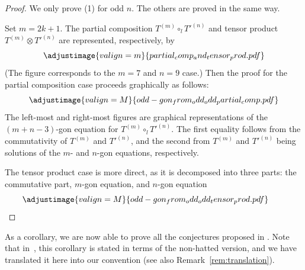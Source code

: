 \documentclass[10pt,a4paper]{amsart}
\numberwithin{equation}{section}
\theoremstyle{definition}
\begin{document}
\begin{proof}
We only prove (1) for odd $n$. The others are proved in the same way.

Set $m=2k+1$. The partial composition $T^{(m)}\circ_lT'^{(n)}$ and tensor product $T^{(m)}\otimes T'^{(n)}$ are represented, respectively, by
 \begin{equation*}
 \adjustimage{valign=m}{partial_comp_and_tensor_prod.pdf}
 \end{equation*}
(The figure corresponds to the $m=7$ and $n=9$ case.) Then the proof for the partial composition case proceeds graphically as follows:
 \begin{equation*}
 \adjustimage{valign=M}{odd-gon_from_odd_odd_partial_comp.pdf}
 \end{equation*}
 The left-most and right-most figures are graphical representations of the $(m+n-3)$-gon equation for $T^{(m)}\circ_lT'^{(n)}$. The first equality follows from the commutativity of $T^{(m)}$ and $T'^{(n)}$, and the second from $T^{(m)}$ and $T'^{(n)}$ being solutions of the $m$- and $n$-gon equations, respectively.

 The tensor product case is more direct, as it is decomposed into three parts: the commutative part, $m$-gon equation, and $n$-gon equation
 \begin{equation*}
 \adjustimage{valign=M}{odd-gon_from_odd_odd_tensor_prod.pdf}\tag*{\qed}
 \end{equation*}\renewcommand{\qed}{}
\end{proof}

As a corollary, we are now able to prove all the conjectures proposed in \cite{muller2024structure}. Note that in~\cite{muller2024structure}, this corollary is stated in terms of the non-hatted version, and we have translated it here into our convention (see also Remark~\ref{rem:translation}).
\end{document}
